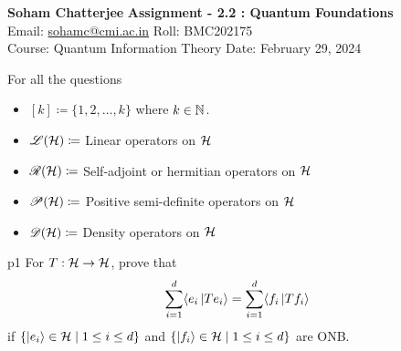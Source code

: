 \documentclass[a4paper, 11pt]{article}
\begin{document}
	
	
	\textsf{\noindent \large\textbf{Soham Chatterjee} \hfill \textbf{Assignment - 2.2 : Quantum Foundations}\\
		Email: \href{sohamc@cmi.ac.in}{sohamc@cmi.ac.in} \hfill Roll: BMC202175\\
		\normalsize Course: Quantum Information Theory \hfill Date: February 29, 2024}
\vspace{1cm}

For all the questions \begin{itemize}
	\item $[k]\coloneqq \{1,2,\dots,k\}$ where $k\in\mathbb{N}$.
	\item ${\mathscr{L}}(\mathcal{H})\coloneqq $ Linear operators on $\mathcal{H}$
	\item ${\mathscr{R}}(\mathcal{H})\coloneqq $ Self-adjoint or hermitian operators on $\mathcal{H}$
	\item ${\mathscr{P}}(\mathcal{H})\coloneqq $ Positive semi-definite operators on $\mathcal{H}$
	\item ${\mathscr{D}}(\mathcal{H})\coloneqq $ Density operators on $\mathcal{H}$
\end{itemize}
	
\begin{problem}{%
	}{p1%
}
For $T:\mathcal{H}\to \mathcal{H}$, prove that  $$\sum_{i=1}^d\langle e_i\ket{Te_i}=\sum_{i=1}^d \langle f_i\ket{Tf_i}$$if $\{\ket{e_i}\in \mathcal{H}\mid 1\leq i\leq d\}$ and $\{\ket{f_i}\in \mathcal{H}\mid 1\leq i\leq d\}$ are ONB.
\end{problem}
	
\end{document}
